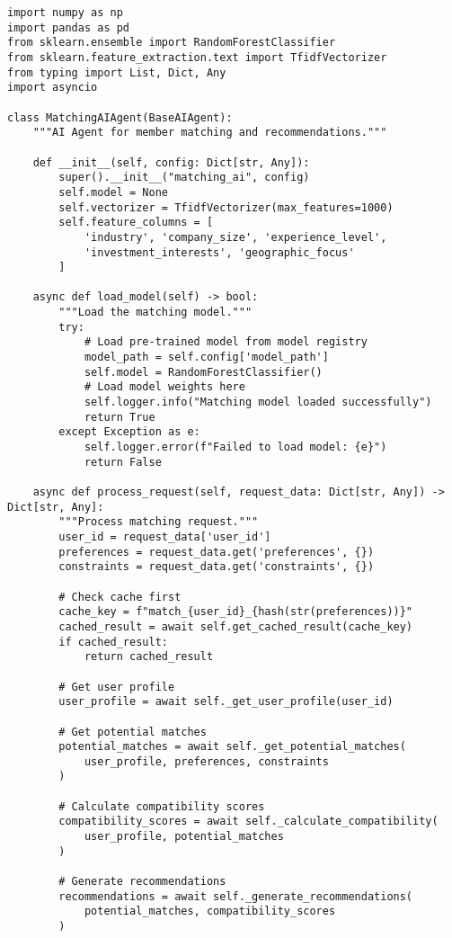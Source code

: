 \begin{verbatim}
import numpy as np
import pandas as pd
from sklearn.ensemble import RandomForestClassifier
from sklearn.feature_extraction.text import TfidfVectorizer
from typing import List, Dict, Any
import asyncio

class MatchingAIAgent(BaseAIAgent):
    """AI Agent for member matching and recommendations."""
    
    def __init__(self, config: Dict[str, Any]):
        super().__init__("matching_ai", config)
        self.model = None
        self.vectorizer = TfidfVectorizer(max_features=1000)
        self.feature_columns = [
            'industry', 'company_size', 'experience_level',
            'investment_interests', 'geographic_focus'
        ]
    
    async def load_model(self) -> bool:
        """Load the matching model."""
        try:
            # Load pre-trained model from model registry
            model_path = self.config['model_path']
            self.model = RandomForestClassifier()
            # Load model weights here
            self.logger.info("Matching model loaded successfully")
            return True
        except Exception as e:
            self.logger.error(f"Failed to load model: {e}")
            return False
    
    async def process_request(self, request_data: Dict[str, Any]) -> Dict[str, Any]:
        """Process matching request."""
        user_id = request_data['user_id']
        preferences = request_data.get('preferences', {})
        constraints = request_data.get('constraints', {})
        
        # Check cache first
        cache_key = f"match_{user_id}_{hash(str(preferences))}"
        cached_result = await self.get_cached_result(cache_key)
        if cached_result:
            return cached_result
        
        # Get user profile
        user_profile = await self._get_user_profile(user_id)
        
        # Get potential matches
        potential_matches = await self._get_potential_matches(
            user_profile, preferences, constraints
        )
        
        # Calculate compatibility scores
        compatibility_scores = await self._calculate_compatibility(
            user_profile, potential_matches
        )
        
        # Generate recommendations
        recommendations = await self._generate_recommendations(
            potential_matches, compatibility_scores
        )
        

\end{verbatim}
